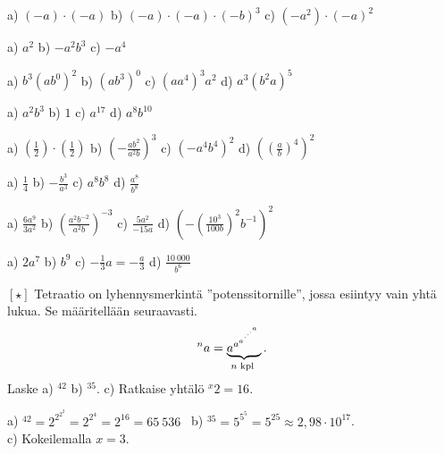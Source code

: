 \begin{tehtavasivu}
    \begin{tehtava}
        a) $(-a)\cdot(-a)$ \qquad
        b) $(-a)\cdot(-a)\cdot(-b)^3$ \qquad
        c) $(-a^2)\cdot(-a)^2$

        \begin{vastaus}
            a) $a^2$ \qquad
            b) $-a^2b^3$ \qquad
            c) $-a^4$
        \end{vastaus}
    \end{tehtava}

 \begin{tehtava}
        a) $b^3(ab^0)^2$ \qquad
        b) $(ab^3)^0$ \qquad
        c) $(aa^4)^3a^2$ \qquad
        d) $a^3(b^2a)^5$

        \begin{vastaus}
            a) $a^2b^3$ \qquad
            b) $1$ \qquad
            c) $a^{17}$ \qquad
            d) $a^8b^{10}$
        \end{vastaus}
    \end{tehtava}

 \begin{tehtava}
        a) $(\frac{1}{2})\cdot(\frac{1}{2})$ \qquad
        b) $(-\frac{ab^2}{a^2b})^3$ \qquad
        c) $(-a^4b^4)^2$ \qquad
        d) $\left((\frac{a}{b})^4\right)^2$
        
        \begin{vastaus}
            a) $\frac{1}{4}$ \qquad
            b) $-\frac{b^3}{a^3}$ \qquad
            c) $a^8b^8$ \qquad
            d) $\frac{a^8}{b^8}$
        \end{vastaus}
    \end{tehtava}
    
    \begin{tehtava}
        a) $\frac{6a^9}{3a^2}$ \qquad
        b) $(\frac{a^2b^{-2}}{a^2b})^{-3}$ \qquad
        c) $\frac{5a^2}{-15a}$ \qquad
        d) $\left(-(\frac{10^3}{100b})^2 b^{-1} \right )^2$
        
        \begin{vastaus}
            a) $2a^7$ \qquad
            b) $b^9$ \qquad
            c) $-\frac{1}{3}a = -\frac{a}{3}$ \qquad
            d) $\frac{10~000}{b^6}$
        \end{vastaus}
    \end{tehtava}

\begin{tehtava}
$\boldsymbol{[\star]}$ Tetraatio on lyhennysmerkintä ''potenssitornille'',
jossa esiintyy vain yhtä lukua. Se määritellään seuraavasti.
\[^na = \underbrace{{a^{a^{a^{\mathstrut^{.^{.^{.^{a}}}}}}}}}_{n\textrm{ kpl }}. \]
Laske \quad a) $^42$  \quad b) $^35$. \quad c) Ratkaise yhtälö $^x2= 16$.
\begin{vastaus}
a) $^42 = 2^{2^{2^2}}=2^{2^4}=2^{16}=65\ 536$ \
b) $^35 = 5^{5^5} = 5^{25} \approx 2,98 \cdot 10^{17}$. \\
c) Kokeilemalla $x =3$.
\end{vastaus}
\end{tehtava}


\end{tehtavasivu}
